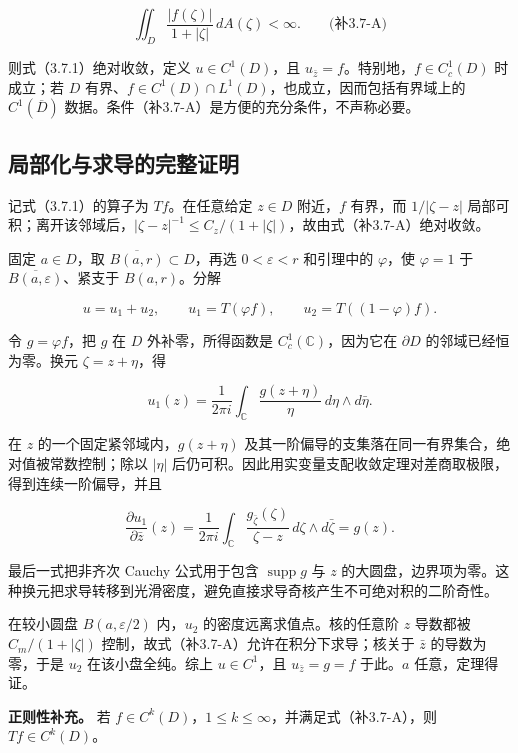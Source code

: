 \documentclass[11pt,a4paper]{article}
\begin{document}
\[
\iint_D\frac{|f(\zeta)|}{1+|\zeta|}\,dA(\zeta)<\infty.
\qquad\text{(补3.7-A)}
\]

则式（3.7.1）绝对收敛，定义 \(u\in C^1(D)\)，且
\(u_{\bar z}=f\)。特别地，\(f\in C_c^1(D)\) 时成立；若 \(D\)
有界、\(f\in C^1(D)\cap L^1(D)\)，也成立，因而包括有界域上的
\(C^1(\overline D)\) 数据。条件（补3.7-A）是方便的充分条件，不声称必要。

\subsection{局部化与求导的完整证明}\label{ch03-s7-ux5c40ux90e8ux5316ux4e0eux6c42ux5bfcux7684ux5b8cux6574ux8bc1ux660e}

记式（3.7.1）的算子为 \(Tf\)。在任意给定 \(z\in D\) 附近，\(f\) 有界，而
\(1/|\zeta-z|\)
局部可积；离开该邻域后，\(|\zeta-z|^{-1}\le C_z/(1+|\zeta|)\)，故由式（补3.7-A）绝对收敛。

固定 \(a\in D\)，取 \(\overline{B(a,r)}\subset D\)，再选
\(0<\varepsilon<r\) 和引理中的 \(\varphi\)，使 \(\varphi=1\) 于
\(\overline{B(a,\varepsilon)}\)、紧支于 \(B(a,r)\)。分解

\[
u=u_1+u_2,
\qquad u_1=T(\varphi f),\qquad u_2=T((1-\varphi)f).
\]

令 \(g=\varphi f\)，把 \(g\) 在 \(D\) 外补零，所得函数是
\(C_c^1(\mathbb C)\)，因为它在 \(\partial D\) 的邻域已经恒为零。换元
\(\zeta=z+\eta\)，得

\[
u_1(z)=\frac1{2\pi i}\int_{\mathbb C}\frac{g(z+\eta)}{\eta}\,d\eta\wedge d\bar\eta.
\]

在 \(z\) 的一个固定紧邻域内，\(g(z+\eta)\)
及其一阶偏导的支集落在同一有界集合，绝对值被常数控制；除以 \(|\eta|\)
后仍可积。因此用实变量支配收敛定理对差商取极限，得到连续一阶偏导，并且

\[
\frac{\partial u_1}{\partial\bar z}(z)
=\frac1{2\pi i}\int_{\mathbb C}\frac{g_{\bar\zeta}(\zeta)}{\zeta-z}\,d\zeta\wedge d\bar\zeta
=g(z).
\]

最后一式把非齐次 Cauchy 公式用于包含 \(\operatorname{supp}g\) 与 \(z\)
的大圆盘，边界项为零。这种换元把求导转移到光滑密度，避免直接求导奇核产生不可绝对积的二阶奇性。

在较小圆盘 \(B(a,\varepsilon/2)\) 内，\(u_2\)
的密度远离求值点。核的任意阶 \(z\) 导数都被 \(C_m/(1+|\zeta|)\)
控制，故式（补3.7-A）允许在积分下求导；核关于 \(\bar z\)
的导数为零，于是 \(u_2\) 在该小盘全纯。综上 \(u\in C^1\)，且
\(u_{\bar z}=g=f\) 于此。\(a\) 任意，定理得证。

\textbf{正则性补充。} 若
\(f\in C^k(D)\)，\(1\le k\le\infty\)，并满足式（补3.7-A），则
\(Tf\in C^k(D)\)。
\end{document}
